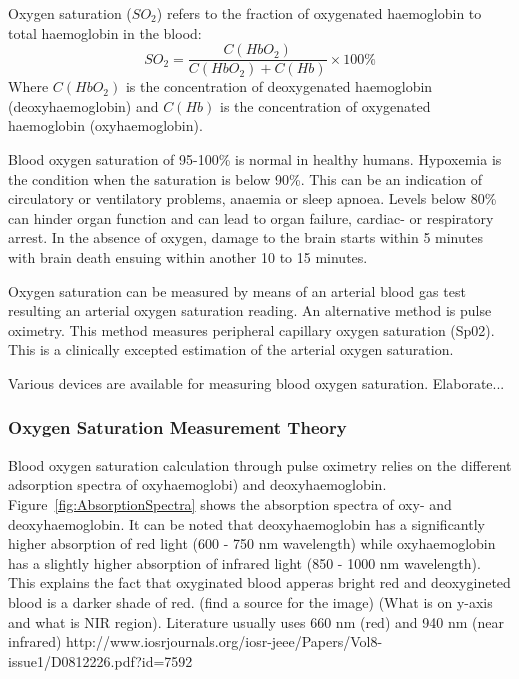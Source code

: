 Oxygen saturation ($SO_2$) refers to the fraction of oxygenated haemoglobin to total haemoglobin in the blood: $$ SO_2 = \frac{C(HbO_2)}{C(HbO_2)+C(Hb)}\times100\% $$ Where $ C(HbO_2) $ is the concentration of deoxygenated haemoglobin (deoxyhaemoglobin) and $ C(Hb)$ is the concentration of oxygenated haemoglobin (oxyhaemoglobin).

Blood oxygen saturation of 95-100\% is normal in healthy humans. Hypoxemia is the condition when the saturation is below 90\%. This can be an indication of circulatory or ventilatory problems, anaemia or sleep apnoea. Levels below 80\% can hinder organ function and can lead to organ failure, cardiac- or respiratory arrest. In the absence of oxygen, damage to the brain starts within 5 minutes with brain death ensuing within another 10 to 15 minutes.

Oxygen saturation can be measured by means of an arterial blood gas test resulting an arterial oxygen saturation reading. An alternative method is pulse oximetry. This method measures peripheral capillary oxygen saturation (Sp02). This is a clinically excepted estimation of the arterial oxygen saturation.

Various devices are available for measuring blood oxygen saturation. Elaborate...

\subsubsection{Oxygen Saturation Measurement Theory}
Blood oxygen saturation calculation through pulse oximetry relies on the different adsorption spectra of oxyhaemoglobi) and deoxyhaemoglobin. Figure~\ref{fig:AbsorptionSpectra} shows the absorption spectra of oxy- and deoxyhaemoglobin. It can be noted that deoxyhaemoglobin has a significantly higher absorption of red light (600 - 750 nm wavelength) while oxyhaemoglobin has a slightly higher absorption of infrared light (850 - 1000 nm wavelength). This explains the fact that oxyginated blood apperas bright red and deoxygineted blood is a darker shade of red. (find a source for the image) (What is on y-axis and what is NIR region). Literature usually uses 660 nm (red) and 940 nm (near infrared) http://www.iosrjournals.org/iosr-jeee/Papers/Vol8-issue1/D0812226.pdf?id=7592

